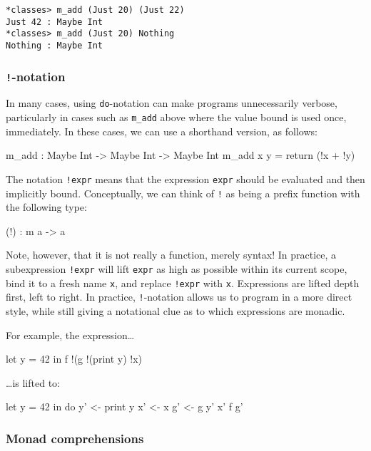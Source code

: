 \begin{lstlisting}[style=stdout]
*classes> m_add (Just 20) (Just 22) 
Just 42 : Maybe Int
*classes> m_add (Just 20) Nothing 
Nothing : Maybe Int
\end{lstlisting}

\subsubsection*{\texttt{!}-notation}

In many cases, using \texttt{do}-notation can make programs unnecessarily
verbose, particularly in cases such as \texttt{m\_add} above where the value
bound is used once, immediately. In these cases, we can use a shorthand
version, as follows:

\begin{code}
m_add : Maybe Int -> Maybe Int -> Maybe Int
m_add x y = return (!x + !y)
\end{code}

\noindent
The notation \texttt{!expr} means that the expression \texttt{expr} should
be evaluated and then implicitly bound. Conceptually,
we can think of \texttt{!} as being a prefix function with the following type:

\begin{code}
(!) : m a -> a
\end{code}

\noindent
Note, however, that it is not really a function, merely syntax! In practice,
a subexpression \texttt{!expr} will lift \texttt{expr} as high as possible within
its current scope, bind it to a fresh name \texttt{x}, and replace \texttt{!expr}
with \texttt{x}. Expressions are lifted depth first, left to right. In
practice, \texttt{!}-notation allows us to program in a more direct style,
while still giving a notational clue as to which expressions are monadic.

For example, the expression\ldots

\begin{code}
let y = 42 in f !(g !(print y) !x) 
\end{code}

\ldots is lifted to:

\begin{code}
let y = 42 in do y' <- print y
                 x' <- x
                 g' <- g y' x'
                 f g'
\end{code}

\subsubsection*{Monad comprehensions}

